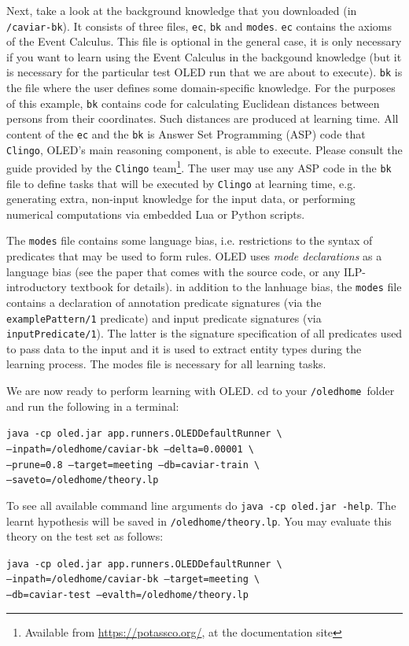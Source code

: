 \documentclass[12pt]{article}
\newcommand{\home}{\texttt{/oledhome}}
\begin{document}
Next, take a look at the background knowledge that you downloaded \linebreak (in \texttt{/caviar-bk}). It consists of three files, \texttt{ec}, \texttt{bk} and \texttt{modes}. \texttt{ec} contains the axioms of the Event Calculus. This file is optional in the general case, it is only necessary if you want to learn using the Event Calculus in the backgound knowledge (but it is necessary for the particular test OLED run that we are about to execute). \texttt{bk} is the file where the user defines some domain-specific knowledge. For the purposes of this example, \texttt{bk} contains code for calculating Euclidean distances between persons from their coordinates. Such distances are produced at learning time. All content of the \texttt{ec} and the \texttt{bk} is Answer Set Programming (ASP) code that \texttt{Clingo}, OLED's main reasoning component, is able to execute. Please consult the guide provided by the \texttt{Clingo} team\footnote{Available from \url{https://potassco.org/}, at the documentation site}. The user may use any ASP code in the \texttt{bk} file to define tasks that will be executed by \texttt{Clingo} at learning time, e.g. generating extra, non-input knowledge for the input data, or performing numerical computations via embedded Lua or Python scripts. 

The \texttt{modes} file contains some language bias, i.e. restrictions to the syntax of predicates that may be used to form rules. OLED uses \emph{mode declarations} as a language bias (see the paper that comes with the source code, or any ILP-introductory textbook for details). in addition to the lanhuage bias, the \texttt{modes} file contains a declaration of annotation predicate signatures (via the \texttt{examplePattern/1} predicate) and input predicate signatures (via \texttt{inputPredicate/1}). The latter is the signature specification of all predicates used to pass data to the input and it is used to extract entity types during the learning process. The modes file is necessary for all learning tasks.

We are now ready to perform learning with OLED. cd to your \home \ folder and run the following in a terminal:

\noindent \texttt{java -cp oled.jar app.runners.OLEDDefaultRunner \textbackslash}\\
\texttt{--inpath=/oledhome/caviar-bk --delta=0.00001 \textbackslash}   \\
\texttt{--prune=0.8 --target=meeting --db=caviar-train \textbackslash}\\
\texttt{--saveto=/oledhome/theory.lp}

To see all available command line arguments do \texttt{java -cp oled.jar -help}. The learnt hypothesis will be saved in \texttt{/oledhome/theory.lp}. You may evaluate this theory on the test set as follows: 

\noindent \texttt{java -cp oled.jar app.runners.OLEDDefaultRunner \textbackslash}\\
\texttt{--inpath=/oledhome/caviar-bk --target=meeting \textbackslash}   \\
\texttt{--db=caviar-test --evalth=/oledhome/theory.lp}
\end{document}
